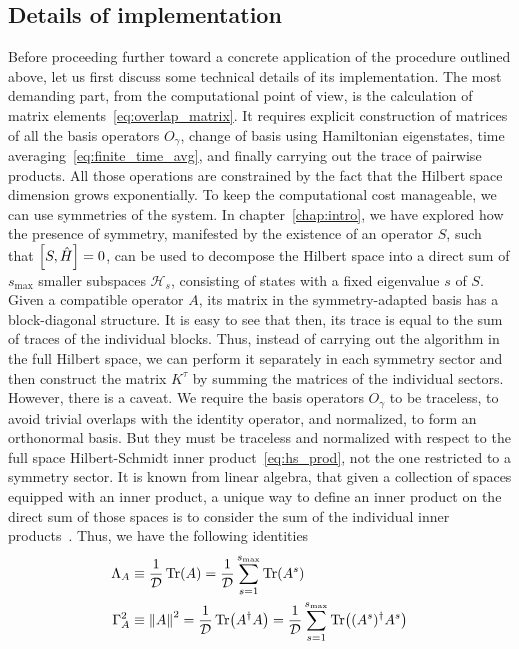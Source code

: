 \subsection{Details of implementation}

Before proceeding further toward a concrete application of the procedure outlined above, let us first discuss
some technical details of its implementation. The most demanding part, from the computational point of view,
is the calculation of matrix elements~\eqref{eq:overlap_matrix}. It requires explicit construction of
matrices of all the basis operators \(O_{\gamma}\), change of basis using Hamiltonian eigenstates,
time averaging~\eqref{eq:finite_time_avg}, and finally carrying out the trace of pairwise products.
All those operations are constrained by the fact that the Hilbert space dimension grows exponentially.
To keep the computational cost manageable, we can use symmetries of the system. In chapter~\ref{chap:intro}, we
have explored how the presence of symmetry, manifested by the existence of an operator \(S\), such
that \(\comm{S}{\hat{H} } = 0\), can be used to decompose the Hilbert space into a direct sum of \(s_{\text{max}}\) smaller
subspaces \(\mathcal{H}_{s}\), consisting of states with a fixed eigenvalue \(s\) of \(S\). Given a
compatible operator \(A\), its matrix in the symmetry-adapted basis has a block-diagonal structure.
It is easy to see that then, its trace is equal to the sum of traces of the individual blocks.
Thus, instead of carrying out the algorithm in the full Hilbert space, we can perform it separately
in each symmetry sector and then construct the matrix \(K^{\tau}\) by summing the matrices of the
individual sectors. However, there is a caveat. We require the basis operators \(O_{\gamma}\) to be
traceless, to avoid trivial overlaps with the identity operator, and normalized, to form an orthonormal
basis. But they must be traceless and normalized with respect to the full space Hilbert-Schmidt inner
product~\eqref{eq:hs_prod}, not the one restricted to a symmetry sector. It is known from linear algebra,
that given a collection of spaces equipped with an inner product, a unique way to define an inner product
on the direct sum of those spaces is to consider the sum of the individual inner products~\autocite{Conway2007}.
Thus, we have the following identities
\begin{align}
  \Lambda_A & \equiv \frac{1}{\mathcal{D}} \Tr(A) = \frac{1}{\mathcal{D}} \sum_{s=1}^{s_{\text{max}}} \Tr(A^s)                                  \\
  \Gamma_A^2  & \equiv \norm{A}^2 = \frac{1}{\mathcal{D}} \Tr(A^{\dag}A) = \frac{1}{\mathcal{D}} \sum_{s=1}^{s_{\text{max}}} \Tr((A^s)^{\dag}A^s)
\end{align}
